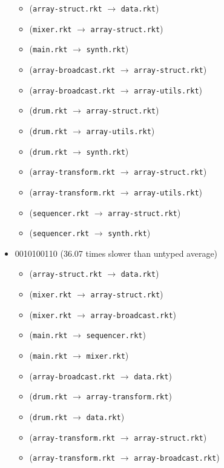 \documentclass{article}
\newcommand{\mono}[1]{\texttt{#1}}
\begin{document}
\begin{itemize}
  \begin{itemize}
  \item (\mono{array-struct.rkt} $\rightarrow$ \mono{data.rkt})
  \item (\mono{mixer.rkt} $\rightarrow$ \mono{array-struct.rkt})
  \item (\mono{main.rkt} $\rightarrow$ \mono{synth.rkt})
  \item (\mono{array-broadcast.rkt} $\rightarrow$ \mono{array-struct.rkt})
  \item (\mono{array-broadcast.rkt} $\rightarrow$ \mono{array-utils.rkt})
  \item (\mono{drum.rkt} $\rightarrow$ \mono{array-struct.rkt})
  \item (\mono{drum.rkt} $\rightarrow$ \mono{array-utils.rkt})
  \item (\mono{drum.rkt} $\rightarrow$ \mono{synth.rkt})
  \item (\mono{array-transform.rkt} $\rightarrow$ \mono{array-struct.rkt})
  \item (\mono{array-transform.rkt} $\rightarrow$ \mono{array-utils.rkt})
  \item (\mono{sequencer.rkt} $\rightarrow$ \mono{array-struct.rkt})
  \item (\mono{sequencer.rkt} $\rightarrow$ \mono{synth.rkt})
  \end{itemize}
\item 0010100110 (36.07 times slower than untyped average)
  \begin{itemize}
  \item (\mono{array-struct.rkt} $\rightarrow$ \mono{data.rkt})
  \item (\mono{mixer.rkt} $\rightarrow$ \mono{array-struct.rkt})
  \item (\mono{mixer.rkt} $\rightarrow$ \mono{array-broadcast.rkt})
  \item (\mono{main.rkt} $\rightarrow$ \mono{sequencer.rkt})
  \item (\mono{main.rkt} $\rightarrow$ \mono{mixer.rkt})
  \item (\mono{array-broadcast.rkt} $\rightarrow$ \mono{data.rkt})
  \item (\mono{drum.rkt} $\rightarrow$ \mono{array-transform.rkt})
  \item (\mono{drum.rkt} $\rightarrow$ \mono{data.rkt})
  \item (\mono{array-transform.rkt} $\rightarrow$ \mono{array-struct.rkt})
  \item (\mono{array-transform.rkt} $\rightarrow$ \mono{array-broadcast.rkt})

\end{itemize}
\end{itemize}
\end{document}
